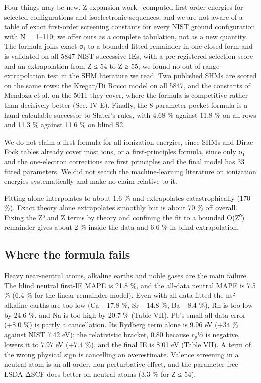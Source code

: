 \documentclass[aps,pra,preprint,notitlepage,superscriptaddress,amsmath,amssymb]{revtex4-2}
\begin{document}
Four things may be new. Z-expansion work~\cite{r4,r5} computed first-order energies for selected configurations and isoelectronic sequences, and we are not aware of a table of exact first-order screening constants for every NIST ground configuration with N = 1–110; we offer ours as a complete tabulation, not as a new quantity. The formula joins exact σ₁ to a bounded fitted remainder in one closed form and is validated on all 5847 NIST successive IEs, with a pre-registered selection score and an extrapolation from Z ≤ 54 to Z ≥ 55; we found no out-of-range extrapolation test in the SHM literature we read. Two published SHMs are scored on the same rows: the Kregar/Di Rocco model on all 5847, and the constants of Mendoza et al. on the 5011 they cover, where the formula is competitive rather than decisively better (Sec. IV E). Finally, the 8-parameter pocket formula is a hand-calculable successor to Slater's rules, with 4.68 \% against 11.8 \% on all rows and 11.3 \% against 11.6 \% on blind S2.


We do not claim a first formula for all ionization energies, since SHMs and Dirac–Fock tables already cover most ions, or a first-principles formula, since only σ₁ and the one-electron corrections are first principles and the final model has 33 fitted parameters. We did not search the machine-learning literature on ionization energies systematically and make no claim relative to it.


Fitting alone interpolates to about 1.6 \% and extrapolates catastrophically (170 \%). Exact theory alone extrapolates smoothly but is about 70 \% off overall. Fixing the Z² and Z terms by theory and confining the fit to a bounded O(Z⁰) remainder gives about 2 \% inside the data and 6.6 \% in blind extrapolation.


\subsection{Where the formula fails}

Heavy near-neutral atoms, alkaline earths and noble gases are the main failure. The blind neutral first-IE MAPE is 21.8 \%, and the all-data neutral MAPE is 7.5 \% (6.4 \% for the linear-remainder model). Even with all data fitted the ns² alkaline earths are too low (Ca −17.8 \%, Sr −14.8 \%, Ba −8.4 \%), Rn is too low by 24.6 \%, and Na is too high by 20.7 \% (Table VII). Pb's small all-data error (+8.0 \%) is partly a cancellation. Its Rydberg term alone is 9.96 eV (+34 \% against NIST 7.42 eV); the relativistic bracket, 0.80 because $r_{p}$½ is negative, lowers it to 7.97 eV (+7.4 \%), and the final IE is 8.01 eV (Table VII). A term of the wrong physical sign is cancelling an overestimate. Valence screening in a neutral atom is an all-order, non-perturbative effect, and the parameter-free LSDA ΔSCF does better on neutral atoms (3.3 \% for Z ≤ 54).
\end{document}
